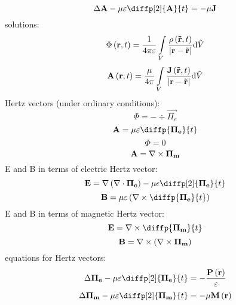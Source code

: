 \begin{equation}
\laplace{\vec{A}} - \mu \varepsilon \diffp[2]{\vec{A}}{t} = -\mu \vec{J}
\end{equation}
solutions:
\begin{equation}
\Phi\left(\mathbf{r}, t \right) = \frac{1}{4 \pi \varepsilon} \int\limits_{V} \frac{\rho\left(\mathbf{\tilde{r}}, t \right)}{\lvert\mathbf{r} - \mathbf{\tilde{r}}\rvert} \mathrm{d} \tilde{V}
\end{equation}
\begin{equation}
\mathbf{A}\left(\mathbf{r}, t \right) = \frac{\mu}{4 \pi} \int\limits_{V} \frac{\mathbf{J}\left(\mathbf{\tilde{r}}, t \right)}{\lvert\mathbf{r} - \mathbf{\tilde{r}}\rvert} \mathrm{d} \tilde{V}
\end{equation}
Hertz vectors (under ordinary conditions):
\begin{equation}
\Phi = - \div{\vec{\Pi_e}}
\end{equation}
\begin{equation}
\vec{A} = \mu \varepsilon \diffp{\vec{\Pi_e}}{t}
\end{equation}
\begin{equation}
\Phi = 0
\end{equation}
\begin{equation}
\mathbf{A} = \nabla \times \mathbf{\Pi_m}
\end{equation}
E and B in terms of electric Hertz vector:
\begin{equation}
\vec{E} = \grad{\left(\div{\vec{\Pi_e}}\right)} - \mu \epsilon \diffp[2]{\vec{\Pi_e}}{t}
\end{equation}
\begin{equation}
\vec{B} = \mu \varepsilon \left(\rot{\diffp{\vec{\Pi_e}}{t}}\right)
\end{equation}
E and B in terms of magnetic Hertz vector:
\begin{equation}
\vec{E} = \rot{\diffp{\vec{\Pi_m}}{t}}
\end{equation}
\begin{equation}
\mathbf{B} = \nabla \times \left(\nabla \times \mathbf{\Pi_m}\right)
\end{equation}
equations for Hertz vectors:
\begin{equation}
\laplace{\vec{\Pi_e}} - \mu \varepsilon \diffp[2]{\vec{\Pi_e}}{t} = -\frac{\vec{P}\left(\vec{r} \right)}{\varepsilon}
\end{equation}
\begin{equation}
\laplace{\vec{\Pi_m}} - \mu \varepsilon \diffp[2]{\vec{\Pi_m}}{t} = -\mu \vec{M}\left(\vec{r} \right)
\end{equation}
